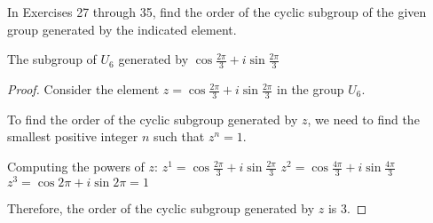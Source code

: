 \documentclass[12pt]{amsart}
\theoremstyle{definition}
\numberwithin{equation}{section}
\theoremstyle{plain}
\begin{document}
    \begin{exercise}{29} In Exercises 27 through 35, find the order of the cyclic subgroup of the given group generated by the indicated element.

        The subgroup of $U_6$ generated by $\cos \frac{2\pi}{3}+ i \sin \frac{2\pi}{3}$
            
        \begin{proof}
        Consider the element \( z = \cos \frac{2\pi}{3} + i \sin \frac{2\pi}{3} \) in the group \( U_6 \). 
        
        To find the order of the cyclic subgroup generated by \( z \), we need to find the smallest positive integer \( n \) such that \( z^n = 1 \).
        
        Computing the powers of \( z \):
        \( z^1 = \cos \frac{2\pi}{3} + i \sin \frac{2\pi}{3} \)
        \( z^2 = \cos \frac{4\pi}{3} + i \sin \frac{4\pi}{3} \)
        \( z^3 = \cos 2\pi + i \sin 2\pi = 1 \)
        
        Therefore, the order of the cyclic subgroup generated by \( z \) is 3.
        \end{proof}
    \end{exercise}
\end{document}
